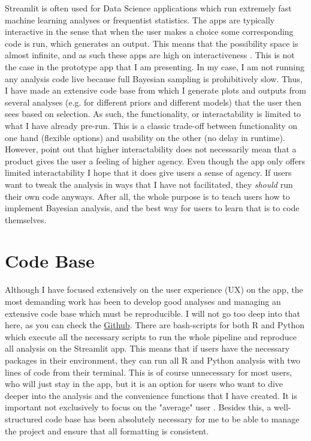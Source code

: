 \documentclass[12pt]{article}
\begin{document}
Streamlit is often used for Data Science applications which run extremely
fast machine learning analyses or frequentist statistics. The apps are typically
interactive in the sense that when the user makes a choice some corresponding code is run,
which generates an output. This means that the possibility space is almost
infinite, and as such these apps are high on interactiveness
\autocite{janlert2017meaning}. This is not the case in the prototype app that
I am presenting. In my case, I am not running any analysis code live because full
Bayesian sampling is prohibitively slow. Thus, I have made an extensive code base
from which I generate plots and outputs from several analyses
(e.g. for different priors and different models) that the user then sees based on
selection. As such, the functionality, or interactability is limited to what I
have already pre-run. This is a classic trade-off between functionality on one
hand (flexible options) and usability on the other (no delay in runtime).
However, \textcite{janlert2017meaning} point out that higher interactability
does not necessarily mean that a product gives the user a feeling of higher agency. Even though the
app only offers limited interactability I hope that it does give users a
sense of agency. If users want to tweak the analysis in ways that I have not
facilitated, they \emph{should} run their own code anyways. After all, the whole
purpose is to teach users how to implement Bayesian analysis,
and the best way for users to learn that is to code themselves.

\section{Code Base}
Although I have focused extensively on the user experience (UX) on the app,
the most demanding work has been to develop good analyses and managing an extensive
code base which must be reproducible. I will not go too deep into that here,
as you can check the
\href{https://github.com/victor-m-p/BayesWorkflow}{Github}.
There are bash-scripts for both R and Python
which execute all the necessary scripts to run the whole pipeline
and reproduce all analysis on the Streamlit app. This means that if users have
the necessary packages in their environment, they can run all R and Python analysis
with two lines of code from their terminal. This is of course unnecessary for most users,
who will just stay in the app, but it is an option for users who want to dive deeper
into the analysis and the convenience functions that I have created. It is
important not exclusively to focus on the "average" user
\autocite[14]{mills1992macintosh}.
Besides this, a well-structured code base has been absolutely necessary for me to
be able to manage the project and ensure that all formatting is consistent.
\end{document}
